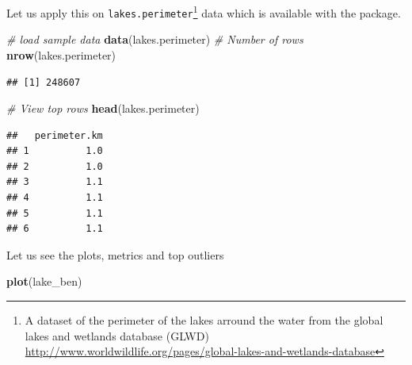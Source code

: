 \documentclass[
]{book}
\newenvironment{Shaded}{\begin{snugshade}}{\end{snugshade}}
\newcommand{\AttributeTok}[1]{\textcolor[rgb]{0.13,0.29,0.53}{#1}}
\newcommand{\CommentTok}[1]{\textcolor[rgb]{0.56,0.35,0.01}{\textit{#1}}}
\newcommand{\DecValTok}[1]{\textcolor[rgb]{0.00,0.00,0.81}{#1}}
\newcommand{\FunctionTok}[1]{\textcolor[rgb]{0.13,0.29,0.53}{\textbf{#1}}}
\newcommand{\NormalTok}[1]{#1}
\newcommand{\OtherTok}[1]{\textcolor[rgb]{0.56,0.35,0.01}{#1}}
\newcommand{\SpecialCharTok}[1]{\textcolor[rgb]{0.81,0.36,0.00}{\textbf{#1}}}
\begin{document}
Let us apply this on \texttt{lakes.perimeter}\footnote{A dataset of the perimeter of the lakes arround the water from the global lakes and wetlands database (GLWD) \url{http://www.worldwildlife.org/pages/global-lakes-and-wetlands-database}} data which is available with the package.

\begin{Shaded}
\begin{Highlighting}[]
\CommentTok{\# load sample data}
\FunctionTok{data}\NormalTok{(lakes.perimeter) }
\CommentTok{\# Number of rows}
\FunctionTok{nrow}\NormalTok{(lakes.perimeter)}
\end{Highlighting}
\end{Shaded}

\begin{verbatim}
## [1] 248607
\end{verbatim}

\begin{Shaded}
\begin{Highlighting}[]
\CommentTok{\# View top rows}
\FunctionTok{head}\NormalTok{(lakes.perimeter)}
\end{Highlighting}
\end{Shaded}

\begin{verbatim}
##   perimeter.km
## 1          1.0
## 2          1.0
## 3          1.1
## 4          1.1
## 5          1.1
## 6          1.1
\end{verbatim}

\begin{Shaded}
\end{Shaded}

Let us see the plots, metrics and top outliers

\begin{Shaded}
\begin{Highlighting}[]
\FunctionTok{plot}\NormalTok{(lake\_ben)}
\end{Highlighting}
\end{Shaded}
\end{document}
